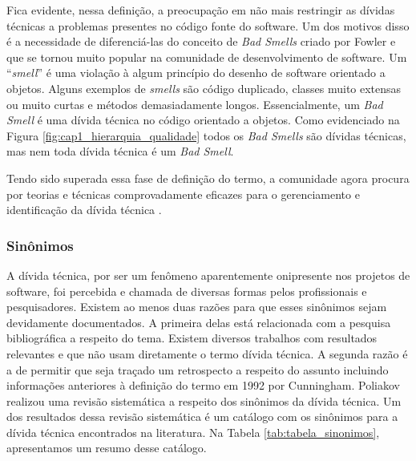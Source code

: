 
Fica evidente, nessa definição, a preocupação em não mais restringir as dívidas técnicas a problemas  presentes no código fonte do software. Um dos motivos disso é a necessidade de diferenciá-las do conceito de \textit{Bad Smells} criado por Fowler\cite{fowler2009refactoring} e que se tornou muito popular na comunidade de desenvolvimento de software\cite{olbrich2009evolution}. Um ``\textit{smell}'' é uma violação à algum princípio do desenho de software orientado a objetos. Alguns exemplos de \textit{smells} são código duplicado, classes muito extensas ou muito curtas e métodos demasiadamente longos\cite{van2002java}. Essencialmente, um \textit{Bad Smell} é uma dívida técnica no código orientado a objetos\cite{poliakov2015systematic}. Como evidenciado na Figura \ref{fig:cap1_hierarquia_qualidade} todos os \textit{Bad Smells} são dívidas técnicas, mas nem toda dívida técnica é um \textit{Bad Smell}.


Tendo sido superada essa fase de definição do termo, a comunidade agora procura por teorias e técnicas comprovadamente eficazes para o gerenciamento e identificação da dívida técnica \cite{falessi2014technical}.





\subsubsection{Sinônimos}

A dívida técnica, por ser um fenômeno aparentemente onipresente nos projetos de software\cite{lim2012balancing,brown2010managing}, foi percebida e chamada de diversas formas pelos profissionais e pesquisadores. Existem ao menos duas razões para que esses sinônimos sejam devidamente documentados. A primeira delas está relacionada com a pesquisa bibliográfica a respeito do tema. Existem diversos trabalhos com resultados relevantes e que não usam diretamente o termo dívida técnica\cite{fowler2018refactoring,lanning1994modeling,lindgren2012bridging,smit2011code}. A segunda razão é a de permitir que seja traçado um retrospecto a respeito do assunto incluindo informações anteriores à definição do termo em 1992 por Cunningham\cite{cunningham1993wycash}. Poliakov realizou uma revisão sistemática a respeito dos sinônimos da dívida técnica\cite{poliakov2015systematic}. Um dos resultados dessa revisão sistemática é um catálogo com os sinônimos para a dívida técnica encontrados na literatura. Na Tabela \ref{tab:tabela_sinonimos}, apresentamos um resumo desse catálogo.

